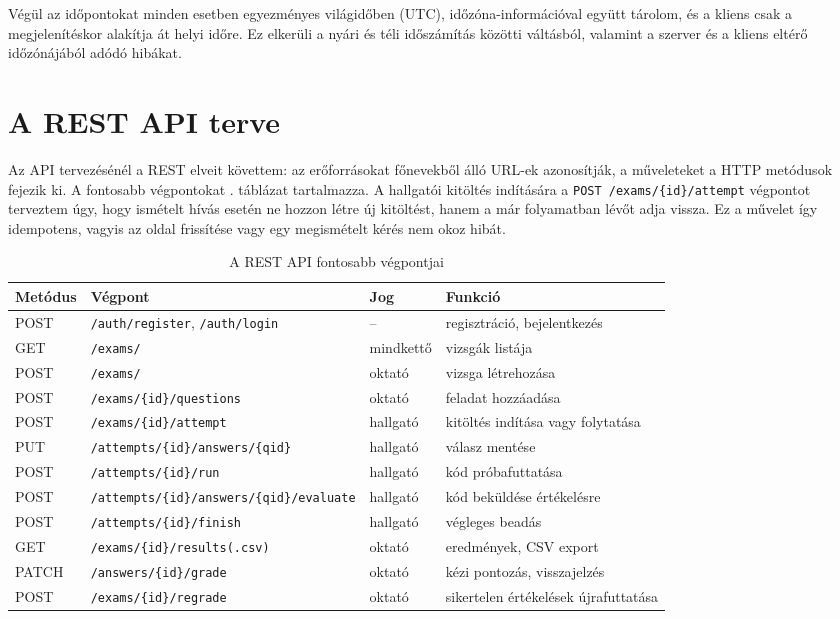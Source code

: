 Végül az időpontokat minden esetben egyezményes világidőben (UTC), időzóna-információval együtt
tárolom, és a kliens csak a megjelenítéskor alakítja át helyi időre. Ez elkerüli a nyári és téli
időszámítás közötti váltásból, valamint a szerver és a kliens eltérő időzónájából adódó hibákat.

\section{A REST API terve}
\label{sec:api}

Az API tervezésénél a REST elveit követtem: az erőforrásokat főnevekből álló URL-ek azonosítják,
a műveleteket a HTTP metódusok fejezik ki. A fontosabb végpontokat . táblázat
tartalmazza. A hallgatói kitöltés indítására a \texttt{POST /exams/\{id\}/attempt} végpontot
terveztem úgy, hogy ismételt hívás esetén ne hozzon létre új kitöltést, hanem a már folyamatban
lévőt adja vissza. Ez a művelet így idempotens, vagyis az oldal frissítése vagy egy megismételt
kérés nem okoz hibát.

\begin{table}[H]
  \centering
  \caption{A REST API fontosabb végpontjai}
  \label{tab:api}
  \small
  \begin{tabularx}{\textwidth}{@{}lp{6.3cm}lX@{}}
    \toprule
    Metódus & Végpont & Jog & Funkció \\
    \midrule
    POST   & \texttt{/auth/register}, \texttt{/auth/login} & -- & regisztráció, bejelentkezés \\
    GET    & \texttt{/exams/} & mindkettő & vizsgák listája \\
    POST   & \texttt{/exams/} & oktató & vizsga létrehozása \\
    POST   & \texttt{/exams/\{id\}/questions} & oktató & feladat hozzáadása \\
    POST   & \texttt{/exams/\{id\}/attempt} & hallgató & kitöltés indítása vagy folytatása \\
    PUT    & \texttt{/attempts/\{id\}/answers/\{qid\}} & hallgató & válasz mentése \\
    POST   & \texttt{/attempts/\{id\}/run} & hallgató & kód próbafuttatása \\
    POST   & \texttt{/attempts/\{id\}/answers/\{qid\}}\newline\texttt{/evaluate} & hallgató & kód beküldése értékelésre \\
    POST   & \texttt{/attempts/\{id\}/finish} & hallgató & végleges beadás \\
    GET    & \texttt{/exams/\{id\}/results(.csv)} & oktató & eredmények, CSV export \\
    PATCH  & \texttt{/answers/\{id\}/grade} & oktató & kézi pontozás, visszajelzés \\
    POST   & \texttt{/exams/\{id\}/regrade} & oktató & sikertelen értékelések újrafuttatása \\
    \bottomrule
  \end{tabularx}
\end{table}


